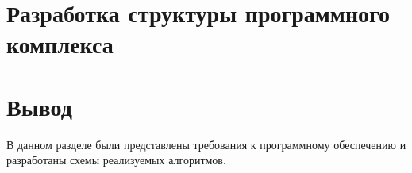 \section{Разработка структуры программного комплекса}

\section{Вывод}

В данном разделе были представлены требования к программному обеспечению и разработаны схемы реализуемых алгоритмов.
